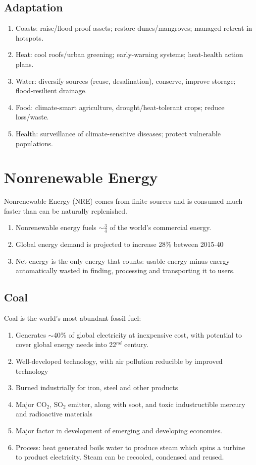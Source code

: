 \documentclass[12pt, a4paper]{article}
\begin{document}
\begin{multicols*}{3}
\subsection{Adaptation}
\begin{enumerate}[\roman*.]
  \item Coasts: raise/flood-proof assets; restore dunes/mangroves; managed retreat in hotspots.
  \item Heat: cool roofs/urban greening; early-warning systems; heat-health action plans.
  \item Water: diversify sources (reuse, desalination), conserve, improve storage; flood-resilient drainage.
  \item Food: climate-smart agriculture, drought/heat-tolerant crops; reduce loss/waste.
  \item Health: surveillance of climate-sensitive diseases; protect vulnerable populations.
\end{enumerate}

\colbreak
\section{Nonrenewable Energy}

Nonrenewable Energy (NRE) comes from finite sources and is consumed much faster than can be naturally replenished.
\begin{enumerate}[\roman*.]
  \item Nonrenewable energy fuels $\sim \frac{3}{4}$ of the world's commercial energy.
  \item Global energy demand is projected to increase 28\% between 2015-40
  \item Net energy is the only energy that counts: usable energy minus energy automatically wasted in finding, processing and transporting it to users.
\end{enumerate}

\subsection{Coal}
Coal is the world's most abundant fossil fuel:
\begin{enumerate}[\roman*.]
  \item Generates $\sim$40\% of global electricity at inexpensive cost, with potential to cover global energy needs into 22$^{nd}$ century.
  \item Well-developed technology, with air pollution reducible by improved technology
  \item Burned industrially for iron, steel and other products
  \item Major CO$_2$, SO$_2$ emitter, along with soot, and toxic industructible mercury and radioactive materials
  \item Major factor in development of emerging and developing economies.
  \item Process: heat generated boils water to produce steam which spins a turbine to product electricity. Steam can be recooled, condensed and reused. 
\end{enumerate}


\end{multicols*}
\end{document}
